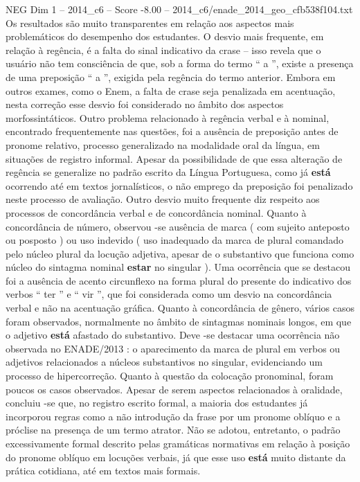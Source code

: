 \begin{textsample}{NEG Dim 1 – 2014\_c6 – Score -8.00 – 2014\_c6/enade\_2014\_geo\_cfb538f104.txt}
Os resultados são muito transparentes em relação aos aspectos mais problemáticos do desempenho dos estudantes.
O desvio mais frequente, em relação à regência, é a falta do sinal indicativo da crase – isso revela que o usuário não tem consciência de que, sob a forma do termo “ a ”, existe a presença de uma preposição “ a ”, exigida pela regência do termo anterior.
Embora em outros exames, como o Enem, a falta de crase seja penalizada em acentuação, nesta correção esse desvio foi considerado no âmbito dos aspectos morfossintáticos.
Outro problema relacionado à regência verbal e à nominal, encontrado frequentemente nas questões, foi a ausência de preposição antes de pronome relativo, processo generalizado na modalidade oral da língua, em situações de registro informal.
Apesar da possibilidade de que essa alteração de regência se generalize no padrão escrito da Língua Portuguesa, como já \textbf{está} ocorrendo até em textos jornalísticos, o não emprego da preposição foi penalizado neste processo de avaliação.
Outro desvio muito frequente diz respeito aos processos de concordância verbal e de concordância nominal.
Quanto à concordância de número, observou -se ausência de marca ( com sujeito anteposto ou posposto ) ou uso indevido ( uso inadequado da marca de plural comandado pelo núcleo plural da locução adjetiva, apesar de o substantivo que funciona como núcleo do sintagma nominal \textbf{estar} no singular ).
Uma ocorrência que se destacou foi a ausência de acento circunflexo na forma plural do presente do indicativo dos verbos “ ter ” e “ vir ”, que foi considerada como um desvio na concordância verbal e não na acentuação gráfica.
Quanto à concordância de gênero, vários casos foram observados, normalmente no âmbito de sintagmas nominais longos, em que o adjetivo \textbf{está} afastado do substantivo.
Deve -se destacar uma ocorrência não observada no ENADE/2013 : o aparecimento da marca de plural em verbos ou adjetivos relacionados a núcleos substantivos no singular, evidenciando um processo de hipercorreção.
Quanto à questão da colocação pronominal, foram poucos os casos observados.
Apesar de serem aspectos relacionados à oralidade, concluiu -se que, no registro escrito formal, a maioria dos estudantes já incorporou regras como a não introdução da frase por um pronome oblíquo e a próclise na presença de um termo atrator.
Não se adotou, entretanto, o padrão excessivamente formal descrito pelas gramáticas normativas em relação à posição do pronome oblíquo em locuções verbais, já que esse uso \textbf{está} muito distante da prática cotidiana, até em textos mais formais.

\end{textsample}
